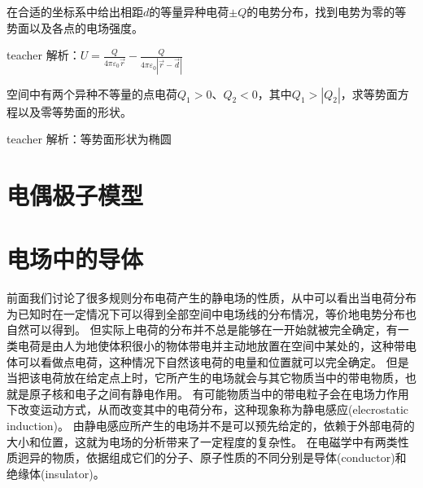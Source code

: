 \begin{example}
在合适的坐标系中给出相距$d$的等量异种电荷$\pm Q$的电势分布，找到电势为零的等势面以及各点的电场强度。
\begin{taggedblock}{teacher}
\newline
解析：$U=\frac{Q}{4\pi\varepsilon_0\vec{r}}-\frac{Q}{4\pi\varepsilon_0|\vec{r}-\vec{d}|}$
\end{taggedblock}
\end{example}

\begin{example}
空间中有两个异种不等量的点电荷$Q_1>0$、$Q_2<0$，其中$Q_1>|Q_2|$，求等势面方程以及零等势面的形状。
\begin{taggedblock}{teacher}
\newline
解析：等势面形状为椭圆
\end{taggedblock}
\end{example}


\section{电偶极子模型}




\section{电场中的导体}

前面我们讨论了很多规则分布电荷产生的静电场的性质，从中可以看出当电荷分布为已知时在一定情况下可以得到全部空间中电场线的分布情况，等价地电势分布也自然可以得到。
但实际上电荷的分布并不总是能够在一开始就被完全确定，有一类电荷是由人为地使体积很小的物体带电并主动地放置在空间中某处的，这种带电体可以看做点电荷，这种情况下自然该电荷的电量和位置就可以完全确定。
但是当把该电荷放在给定点上时，它所产生的电场就会与其它物质当中的带电物质，也就是原子核和电子之间有静电作用。
有可能物质当中的带电粒子会在电场力作用下改变运动方式，从而改变其中的电荷分布，这种现象称为{\heiti 静电感应}(elecrostatic induction)。
由静电感应所产生的电场并不是可以预先给定的，依赖于外部电荷的大小和位置，这就为电场的分析带来了一定程度的复杂性。
在电磁学中有两类性质迥异的物质，依据组成它们的分子、原子性质的不同分别是{\heiti 导体}(conductor)和{\heiti 绝缘体}(insulator)。

